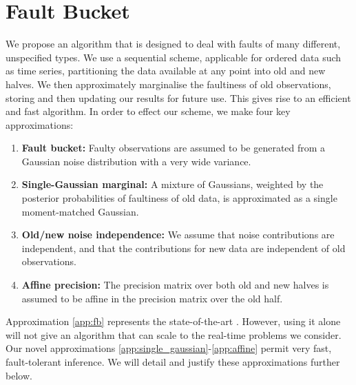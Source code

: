 \documentclass[twoside]{article}
\begin{document}
\section{Fault Bucket}\label{bucket}

We propose an algorithm that is designed to deal with faults of many different, unspecified types. We use a sequential scheme, applicable for ordered data such as time series, partitioning the data available at any point into old and new halves.  We then approximately marginalise the faultiness of old observations, storing and then updating our results for future use. This gives rise to an efficient and fast algorithm. In order to effect our scheme, we make four key approximations:
\begin{enumerate}
 \item \label{app:fb} {\bf Fault bucket:} Faulty observations are assumed to be generated from a Gaussian noise distribution with a very wide variance.
\item \label{app:single_gaussian} {\bf Single-Gaussian marginal:} A mixture of Gaussians, weighted by the posterior probabilities of faultiness of old data, is approximated as a single moment-matched Gaussian.
\item \label{app:independence} {\bf Old/new noise independence:} We assume that noise contributions are independent, and that the contributions for new data are independent of old observations.
\item \label{app:affine} {\bf Affine precision:} The precision matrix over both old and new halves is assumed to be affine in the precision matrix over the old half.
\end{enumerate}
Approximation \ref{app:fb} represents the state-of-the-art \cite{Dereszynski}. However, using it alone will not give an algorithm that can scale to the real-time problems we consider. Our novel approximations \ref{app:single_gaussian}-\ref{app:affine} permit very fast, fault-tolerant inference. We will detail and justify these approximations further below.
\end{document}
